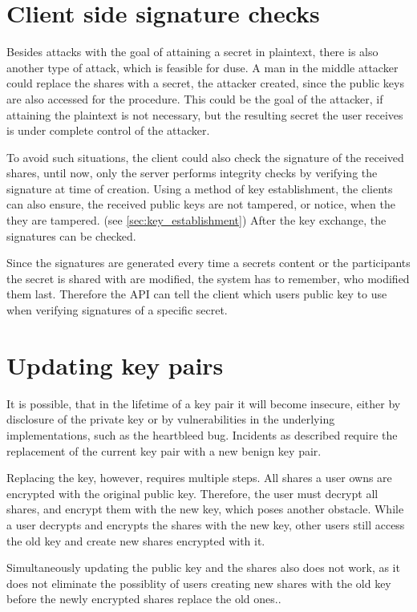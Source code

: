 \section{Client side signature checks}
\label{sec:future:client_sig_check}

Besides attacks with the goal of attaining a secret in plaintext, there is also
another type of attack, which is feasible for duse. A man in the middle
attacker could replace the shares with a secret, the attacker created, since
the public keys are also accessed for the procedure. This could be the goal of
the attacker, if attaining the plaintext is not necessary, but the resulting
secret the user receives is under complete control of the attacker.

To avoid such situations, the client could also check the signature of the
received shares, until now, only the server performs integrity checks by
verifying the signature at time of creation. Using a method of key
establishment, the clients can also ensure, the received public keys are not
tampered, or notice, when the they are tampered. (see
\ref{sec:key_establishment}) After the key exchange, the signatures can be
checked.

Since the signatures are generated every time a secrets content or the
participants the secret is shared with are modified, the system has to
remember, who modified them last. Therefore the API can tell the client which
users public key to use when verifying signatures of a specific secret.

\section{Updating key pairs}

It is possible, that in the lifetime of a key pair it will become insecure,
either by disclosure of the private key or by vulnerabilities in the underlying
implementations, such as the heartbleed bug. Incidents as described require
the replacement of the current key pair with a new benign key pair.

Replacing the key, however, requires multiple steps. All shares a user owns are
encrypted with the original public key. Therefore, the user must decrypt all
shares, and encrypt them with the new key, which poses another obstacle. While
a user decrypts and encrypts the shares with the new key, other users still
access the old key and create new shares encrypted with it.

Simultaneously updating the public key and the shares also does not work, as it
does not eliminate the possiblity of users creating new shares with the old key
before the newly encrypted shares replace the old ones..

